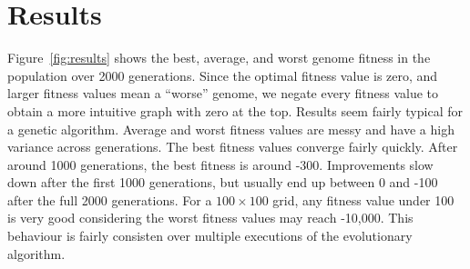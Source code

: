 
\section{Results}

Figure~\ref{fig:results} shows the best, average, and worst genome fitness in the population over 2000 generations. Since the optimal fitness value is zero, and larger fitness values mean a ``worse'' genome, we negate every fitness value to obtain a more intuitive graph with zero at the top. Results seem fairly typical for a genetic algorithm. Average and worst fitness values are messy and have a high variance across generations. The best fitness values converge fairly quickly. After around 1000 generations, the best fitness is around -300. Improvements slow down after the first 1000 generations, but usually end up between 0 and -100 after the full 2000 generations. For a $100 \times 100$ grid, any fitness value under 100 is very good considering the worst fitness values may reach -10,000. This behaviour is fairly consisten over multiple executions of the evolutionary algorithm.

